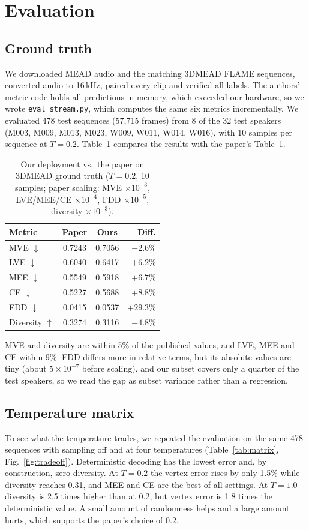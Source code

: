 \documentclass[10pt,twocolumn,letterpaper]{article}
\begin{document}
\section{Evaluation}
\label{sec:eval}
\subsection{Ground truth}
We downloaded MEAD audio and the matching 3DMEAD FLAME sequences, converted audio to 16\,kHz, paired every clip and verified all labels. The authors' metric code holds all predictions in memory, which exceeded our hardware, so we wrote \texttt{eval\_stream.py}, which computes the same six metrics incrementally. We evaluated 478 test sequences (57{,}715 frames) from 8 of the 32 test speakers (M003, M009, M013, M023, W009, W011, W014, W016), with 10 samples per sequence at $T{=}0.2$. Table~\ref{tab:gt} compares the results with the paper's Table~1.

\begin{table}[t]
\centering\small
\caption{Our deployment vs.\ the paper on 3DMEAD ground truth ($T{=}0.2$, 10 samples; paper scaling: MVE $\times10^{-3}$, LVE/MEE/CE $\times10^{-4}$, FDD $\times10^{-5}$, diversity $\times10^{-3}$).}
\label{tab:gt}
\begin{tabular}{@{}lccr@{}}
\toprule
Metric & Paper & Ours & Diff.\\
\midrule
MVE $\downarrow$ & 0.7243 & 0.7056 & $-2.6\%$\\
LVE $\downarrow$ & 0.6040 & 0.6417 & $+6.2\%$\\
MEE $\downarrow$ & 0.5549 & 0.5918 & $+6.7\%$\\
CE $\downarrow$ & 0.5227 & 0.5688 & $+8.8\%$\\
FDD $\downarrow$ & 0.0415 & 0.0537 & $+29.3\%$\\
Diversity $\uparrow$ & 0.3274 & 0.3116 & $-4.8\%$\\
\bottomrule
\end{tabular}
\end{table}

MVE and diversity are within 5\% of the published values, and LVE, MEE and CE within 9\%. FDD differs more in relative terms, but its absolute values are tiny (about $5\times10^{-7}$ before scaling), and our subset covers only a quarter of the test speakers, so we read the gap as subset variance rather than a regression.

\subsection{Temperature matrix}
To see what the temperature trades, we repeated the evaluation on the same 478 sequences with sampling off and at four temperatures (Table~\ref{tab:matrix}, Fig.~\ref{fig:tradeoff}). Deterministic decoding has the lowest error and, by construction, zero diversity. At $T{=}0.2$ the vertex error rises by only 1.5\% while diversity reaches 0.31, and MEE and CE are the best of all settings. At $T{=}1.0$ diversity is 2.5 times higher than at $0.2$, but vertex error is 1.8 times the deterministic value. A small amount of randomness helps and a large amount hurts, which supports the paper's choice of $0.2$.
\end{document}

